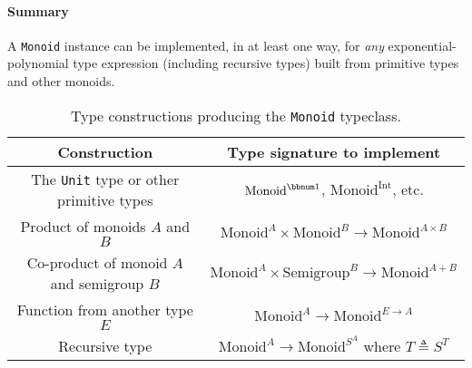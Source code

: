 \paragraph{Summary}

A \lstinline!Monoid! instance can be implemented, in at least one
way, for \emph{any} exponential-polynomial type
expression (including recursive types) built from primitive types
and other monoids.%
\begin{comment}
There exist other type constructions that work for monoids in special
cases. One example is the \textsf{``}twisted product\textsf{''} $P\times Q$ where
$P$ and $Q$ are monoids and additionally $P$ has an \textbf{action
on} $Q$. The \textsf{``}action\textsf{''} is a function $\alpha:P\rightarrow Q\rightarrow Q$
obeying the special composition law, $\alpha(p_{1})\bef\alpha(p_{2})=\alpha(p_{1}\oplus p_{2})$.
The monoidal operation is defined by:
\[
(p_{1}\times q_{1})\oplus(p_{2}\times q_{2})=(p_{1}\oplus p_{2})\times(\alpha(p_{2})(q_{1})\oplus q_{2})\quad.
\]
 Examples of this construction are twisted products $\left(A\rightarrow A\right)\times A$
and $\bbnum 2\times\left(\bbnum 1+A\right)$. \textemdash{} Not sure
how useful this is, and what additional properties we need.
\end{comment}

\begin{table}
\begin{centering}
\begin{tabular}{|c|c|}
\hline 
\textbf{\footnotesize{}Construction} & \textbf{\footnotesize{}Type signature to implement}\tabularnewline
\hline 
\hline 
{\footnotesize{}The }\lstinline!Unit!{\footnotesize{} type or other
primitive types} & {\footnotesize{}$\text{Monoid}^{\bbnum 1}$, $\text{Monoid}^{\text{Int}}$,
etc.}\tabularnewline
\hline 
{\footnotesize{}Product of monoids $A$ and $B$} & {\footnotesize{}$\text{Monoid}^{A}\times\text{Monoid}^{B}\rightarrow\text{Monoid}^{A\times B}$}\tabularnewline
\hline 
{\footnotesize{}Co-product of monoid $A$ and semigroup $B$} & {\footnotesize{}$\text{Monoid}^{A}\times\text{Semigroup}^{B}\rightarrow\text{Monoid}^{A+B}$}\tabularnewline
\hline 
{\footnotesize{}Function from another type $E$} & {\footnotesize{}$\text{Monoid}^{A}\rightarrow\text{Monoid}^{E\rightarrow A}$}\tabularnewline
\hline 
{\footnotesize{}Recursive type} & {\footnotesize{}$\text{Monoid}^{A}\rightarrow\text{Monoid}^{S^{A}}$
where $T\triangleq S^{T}$}\tabularnewline
\hline 
\end{tabular}
\par\end{centering}
\caption{Type constructions producing the \lstinline!Monoid! typeclass.\label{tab:Type-constructions-for-monoid}}
\end{table}


